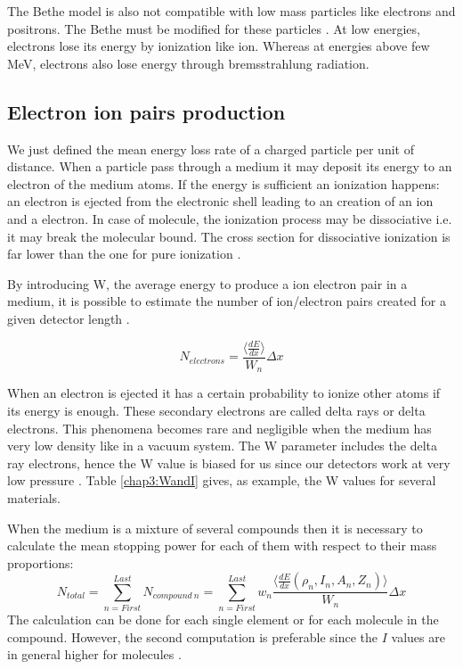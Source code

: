 \begin{refsection}
	The Bethe model is also not compatible with low mass particles like electrons and positrons. The Bethe must be modified for these particles \cite{Rieke1972}\cite[p. 452]{Tanabashi2018}. At low energies, electrons lose its energy by ionization like ion. Whereas at energies above few MeV, electrons also lose energy through bremsstrahlung radiation.

	\subsection{Electron ion pairs production}
	We just defined the mean energy loss rate of a charged particle per unit of distance. When a particle pass through a medium it may deposit its energy to an electron of the medium atoms.
	If the energy is sufficient an ionization happens: an electron is ejected from the electronic shell leading to an creation of an ion and a electron. In case of molecule, the ionization process may be dissociative i.e. it may break the molecular bound. The cross section for dissociative ionization is far lower than the one for pure ionization \cite{Dimopoulou2004}.

	By introducing W, the average energy to produce a ion electron pair in a medium, it is possible to estimate the number of ion/electron pairs created for a given detector length \cite[]{Weiss1955,Bichsel1979}.

	\begin{equation}
		N_{electrons}= \frac{\big \langle \frac{dE}{dx} \big \rangle}{W_{n}} \Delta x
	\end{equation}

	When an electron is ejected it has a certain probability to ionize other atoms if its energy is enough. These secondary electrons are called delta rays or delta electrons. This phenomena becomes rare and negligible when the medium has very low density like in a vacuum system. The W parameter includes the delta ray electrons, hence the W value is biased for us since our detectors work at very low pressure \cite[p. 470]{Tanabashi2018}. Table \ref{chap3:WandI} gives, as example, the W values for several materials.

	

	When the medium is a mixture of several compounds then it is necessary to calculate the mean stopping power for each of them with respect to their mass proportions:
	\begin{equation}
		N_{total}= \sum_{n= First}^{Last} N_{compound\ n}= \sum_{n= First}^{Last} w_{n} \frac{\big \langle \frac{dE}{dx}\left(\rho_{n},I_{n},A_{n},Z_{n}\right) \big \rangle}{W_{n}} \Delta x
	\end{equation}
	The calculation can be done for each single element or for each molecule in the compound.
	However, the second computation is preferable since the \(I\) values are in general higher for molecules \cite[p. 451]{Tanabashi2018}.


\end{refsection}
